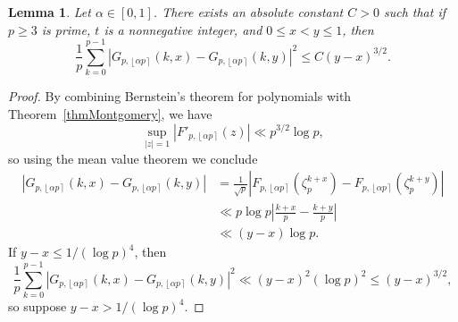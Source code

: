 \documentclass[reqno]{amsart}
\newtheorem{lemma}[theorem]{Lemma}
\numberwithin{equation}{section}
\numberwithin{table}{section}
\numberwithin{figure}{section}
\newcommand{\abs}[1]{\left\lvert#1\right\rvert}
\newcommand{\round}[1]{\left\lfloor#1\right\rceil}
\begin{document}
\begin{lemma}\label{lemEquicont}
Let $\alpha\in[0,1]$.
There exists an absolute constant $C>0$ such that if $p\geq3$ is prime, $t$ is a nonnegative integer, and $0\leq x<y\leq1$, then
\[
\frac{1}{p} \sum_{k=0}^{p-1} \abs{G_{p,\round{\alpha p}}(k,x) - G_{p,\round{\alpha p}}(k,y)}^2 \leq C(y-x)^{3/2}.
\]
\end{lemma}

\begin{proof}
By combining Bernstein's theorem for polynomials with Theorem~\ref{thmMontgomery}, we have
\[
\sup_{\abs{z}=1} \abs{F'_{p,\round{\alpha p}}(z)} \ll p^{3/2} \log p,
\]
so using the mean value theorem we conclude
\begin{align*}
\abs{G_{p,\round{\alpha p}}(k,x) - G_{p,\round{\alpha p}}(k,y)}
&= \frac{1}{\sqrt{p}} \abs{F_{p,\round{\alpha p}}(\zeta_p^{k+x}) - F_{p,\round{\alpha p}}(\zeta_p^{k+y})}\\
&\ll p\log p \abs{\frac{k+x}{p} - \frac{k+y}{p}}\\
&\ll (y-x)\log p.
\end{align*}
If $y-x \leq 1/(\log p)^4$, then
\[
\frac{1}{p} \sum_{k=0}^{p-1} \abs{G_{p,\round{\alpha p}}(k,x) - G_{p,\round{\alpha p}}(k,y)}^2 \ll (y-x)^2 (\log p)^2 \leq (y-x)^{3/2},
\]
so suppose $y-x > 1/(\log p)^4$.


\end{proof}
\end{document}
